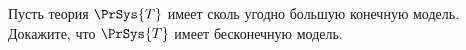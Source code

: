 Пусть теория $\PrSys{T}$ имеет сколь угодно большую конечную модель. Докажите, что $\PrSys{T}$ имеет
бесконечную модель.
